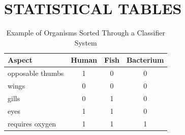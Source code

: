 \documentclass{strrespaper-trad}
\begin{document}
		

	\section{STATISTICAL TABLES}
		\begin{table}[htbp]
			\centering
			\caption{Example of Organisms Sorted Through a Classifier System}
			\label{tab:ex_classifier}
			\begin{tabular}{lccc}
				\toprule
				Aspect           & Human & Fish & Bacterium \\
				\midrule
				opposable thumbs & 1     & 0    & 0         \\
				wings            & 0     & 0    & 0         \\
				gills            & 0     & 1    & 0         \\
				eyes             & 1     & 1    & 0         \\
				requires oxygen  & 1     & 1    & 1         \\
				\bottomrule
			\end{tabular}
		\end{table}
\end{document}
